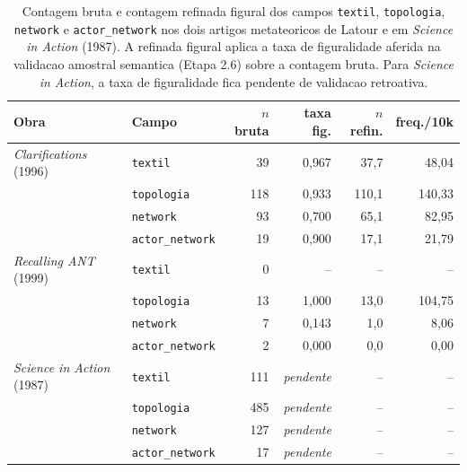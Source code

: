 \begin{table}[htbp]
\centering
\caption[Campos textil, topologia, network e actor-network: bruta x refinada]{Contagem bruta e contagem refinada figural dos campos \texttt{textil}, \texttt{topologia}, \texttt{network} e \texttt{actor\_network} nos dois artigos metateoricos de Latour e em \emph{Science in Action} (1987). A refinada figural aplica a taxa de figuralidade aferida na validacao amostral semantica (Etapa 2.6) sobre a contagem bruta. Para \emph{Science in Action}, a taxa de figuralidade fica pendente de validacao retroativa.}
\label{tab:textil-topologico-refinado}
\footnotesize
\begin{tabular}{llrrrr}
\toprule
Obra & Campo & $n$ bruta & taxa fig. & $n$ refin. & freq./10k \\
\midrule
\emph{Clarifications} (1996) & \texttt{textil} & 39 & 0{,}967 & 37{,}7 & 48{,}04 \\
 & \texttt{topologia} & 118 & 0{,}933 & 110{,}1 & 140{,}33 \\
 & \texttt{network} & 93 & 0{,}700 & 65{,}1 & 82{,}95 \\
 & \texttt{actor\_network} & 19 & 0{,}900 & 17{,}1 & 21{,}79 \\
\midrule
\emph{Recalling ANT} (1999) & \texttt{textil} & 0 & -- & -- & -- \\
 & \texttt{topologia} & 13 & 1{,}000 & 13{,}0 & 104{,}75 \\
 & \texttt{network} & 7 & 0{,}143 & 1{,}0 & 8{,}06 \\
 & \texttt{actor\_network} & 2 & 0{,}000 & 0{,}0 & 0{,}00 \\
\midrule
\emph{Science in Action} (1987) & \texttt{textil} & 111 & \textit{pendente} & -- & -- \\
 & \texttt{topologia} & 485 & \textit{pendente} & -- & -- \\
 & \texttt{network} & 127 & \textit{pendente} & -- & -- \\
 & \texttt{actor\_network} & 17 & \textit{pendente} & -- & -- \\
\bottomrule
\end{tabular}
\end{table}
